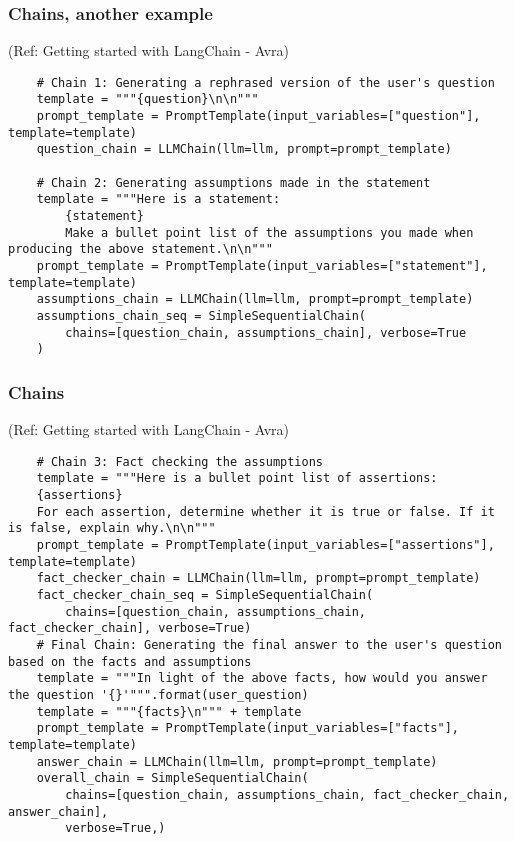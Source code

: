 \begin{frame}[fragile]\frametitle{Chains, another example}

{\tiny (Ref: Getting started with LangChain - Avra)}


\begin{lstlisting}
    # Chain 1: Generating a rephrased version of the user's question
    template = """{question}\n\n"""
    prompt_template = PromptTemplate(input_variables=["question"], template=template)
    question_chain = LLMChain(llm=llm, prompt=prompt_template)

    # Chain 2: Generating assumptions made in the statement
    template = """Here is a statement:
        {statement}
        Make a bullet point list of the assumptions you made when producing the above statement.\n\n"""
    prompt_template = PromptTemplate(input_variables=["statement"], template=template)
    assumptions_chain = LLMChain(llm=llm, prompt=prompt_template)
    assumptions_chain_seq = SimpleSequentialChain(
        chains=[question_chain, assumptions_chain], verbose=True
    )

\end{lstlisting}

\end{frame}

\begin{frame}[fragile]\frametitle{Chains}

{\tiny (Ref: Getting started with LangChain - Avra)}


\begin{lstlisting}
    # Chain 3: Fact checking the assumptions
    template = """Here is a bullet point list of assertions:
    {assertions}
    For each assertion, determine whether it is true or false. If it is false, explain why.\n\n"""
    prompt_template = PromptTemplate(input_variables=["assertions"], template=template)
    fact_checker_chain = LLMChain(llm=llm, prompt=prompt_template)
    fact_checker_chain_seq = SimpleSequentialChain(
        chains=[question_chain, assumptions_chain, fact_checker_chain], verbose=True)
    # Final Chain: Generating the final answer to the user's question based on the facts and assumptions
    template = """In light of the above facts, how would you answer the question '{}'""".format(user_question)
    template = """{facts}\n""" + template
    prompt_template = PromptTemplate(input_variables=["facts"], template=template)
    answer_chain = LLMChain(llm=llm, prompt=prompt_template)
    overall_chain = SimpleSequentialChain(
        chains=[question_chain, assumptions_chain, fact_checker_chain, answer_chain],
        verbose=True,)
\end{lstlisting}


\end{frame}

